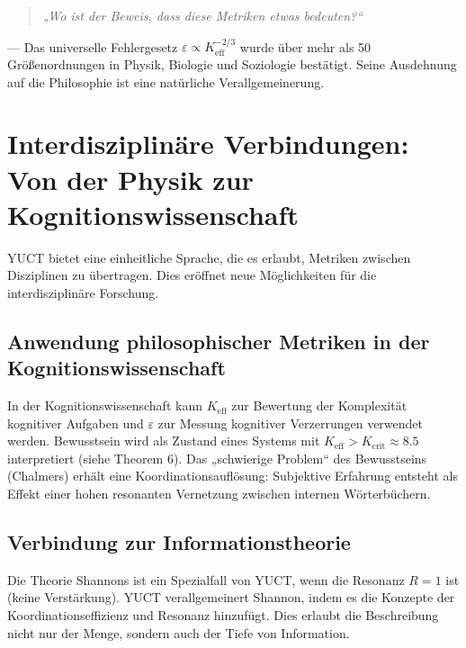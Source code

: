 \documentclass[12pt,a4paper]{article}
\newcommand{\eps}{\varepsilon}
\begin{document}
	\begin{quote}
		\textit{„Wo ist der Beweis, dass diese Metriken etwas bedeuten?“}
	\end{quote}
	— Das universelle Fehlergesetz \(\eps \propto K_{\mathrm{eff}}^{-2/3}\) wurde über mehr als 50 Größenordnungen in Physik, Biologie und Soziologie bestätigt. Seine Ausdehnung auf die Philosophie ist eine natürliche Verallgemeinerung.
	
	\section{Interdisziplinäre Verbindungen: Von der Physik zur Kognitionswissenschaft}
	\label{sec:interdisciplinary}
	
	YUCT bietet eine einheitliche Sprache, die es erlaubt, Metriken zwischen Disziplinen zu übertragen. Dies eröffnet neue Möglichkeiten für die interdisziplinäre Forschung.
	
	\subsection{Anwendung philosophischer Metriken in der Kognitionswissenschaft}
	
	In der Kognitionswissenschaft kann \(K_{\mathrm{eff}}\) zur Bewertung der Komplexität kognitiver Aufgaben und \(\eps\) zur Messung kognitiver Verzerrungen verwendet werden. Bewusstsein wird als Zustand eines Systems mit \(K_{\mathrm{eff}} > K_{\mathrm{crit}} \approx 8.5\) interpretiert (siehe Theorem 6). Das „schwierige Problem“ des Bewusstseins (Chalmers) erhält eine Koordinationsauflösung: Subjektive Erfahrung entsteht als Effekt einer hohen resonanten Vernetzung zwischen internen Wörterbüchern.
	
	\subsection{Verbindung zur Informationstheorie}
	
	Die Theorie Shannons ist ein Spezialfall von YUCT, wenn die Resonanz \(R = 1\) ist (keine Verstärkung). YUCT verallgemeinert Shannon, indem es die Konzepte der Koordinationseffizienz und Resonanz hinzufügt. Dies erlaubt die Beschreibung nicht nur der Menge, sondern auch der Tiefe von Information.
	
\end{document}
